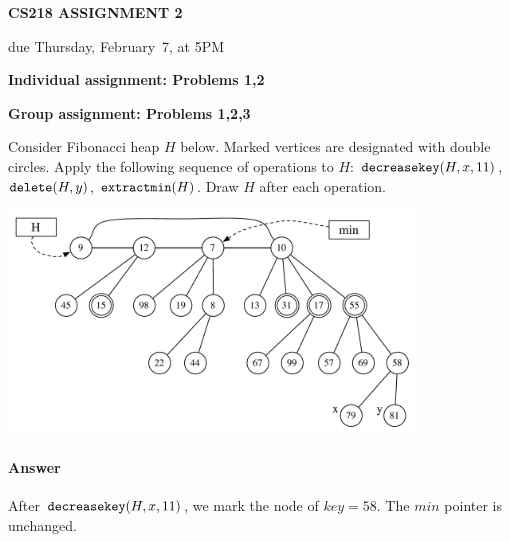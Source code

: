 \documentclass[11pt]{article}
\newcommand{\delete}{{\mbox{\tt delete}}}
\newcommand{\decreasekey}{{\mbox{\tt decreasekey}}}
\newcommand{\extractmin}{{\mbox{\tt extractmin}}}
\begin{document}
\centerline{\large \bf CS218 ASSIGNMENT 2}
\centerline{due Thursday, February~7, at 5PM}

\vskip 0.1in
\noindent
{\bf Individual assignment: Problems 1,2}

\noindent
{\bf Group assignment: Problems 1,2,3}

\vskip 0.1in


\begin{problem}
Consider Fibonacci heap $H$ below. Marked vertices are designated
with double circles. Apply the following sequence of operations to $H$:
$\decreasekey(H,x,11)$, $\delete(H,y)$, $\extractmin(H)$. Draw $H$
after each operation.

\noindent
\begin{center}
\includegraphics[width=4.25in]{hw2_fib_heap.pdf} %
\end{center}

\end{problem}

\paragraph{Answer}
After $\decreasekey(H,x,11)$, we mark the node of $key=58$. The $min$ pointer is unchanged.
\end{document}
